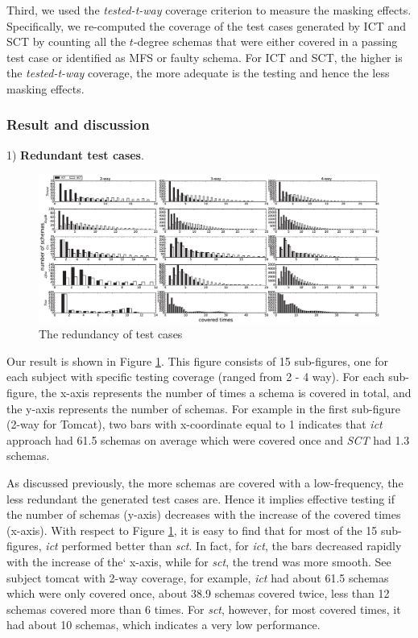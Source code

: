 \documentclass[journal,12pt,onecolumn,draftclsnofoot,]{IEEEtran}
\begin{document}
Third, we used the \emph{tested-t-way} coverage criterion \cite{yilmaz2013reducing} to measure the masking effects. Specifically, we re-computed the coverage of the test cases generated by ICT and SCT by counting all the $t$-degree schemas that were either covered in a passing test case or identified as MFS or faulty schema. For ICT and SCT, the higher is the \emph{tested-t-way} coverage, the more adequate is the testing and hence the less masking effects.


\subsubsection{Result and discussion}

1) \textbf{Redundant test cases}.

\begin{figure}[ht]
 \includegraphics[width=7.0in]{ex1.eps}
\caption{The redundancy of test cases}
\label{ex1_result}
\end{figure}

Our result is shown in Figure \ref{ex1_result}. This figure consists of 15 sub-figures, one for each subject with specific testing coverage (ranged from 2 - 4 way). For each sub-figure, the x-axis represents the number of times a schema is covered in total, and the y-axis represents the number of schemas.  For example in the first sub-figure (2-way for Tomcat), two bars with x-coordinate equal to 1 indicates that \emph{ict} approach had 61.5 schemas {\color{red}on average} which were covered once and \emph{SCT} had 1.3 schemas.


As discussed previously, the more schemas are covered with a low-frequency, the less redundant the generated test cases are. Hence it implies effective testing if the number of schemas (y-axis) decreases with the increase of the covered times (x-axis). With respect to Figure \ref{ex1_result}, it is easy to find that for most of the 15 sub-figures, \emph{ict} performed better than \emph{sct}. In fact, for \emph{ict}, the bars decreased rapidly with the increase of the` x-axis, while for \emph{sct}, the trend was more smooth. See subject tomcat with 2-way coverage, for example, \emph{ict} had about 61.5 schemas which were only covered once,  about 38.9 schemas covered twice, less than 12 schemas covered more than 6 times.  For \emph{sct}, however, for most covered times, it had about 10 schemas, which indicates a very low performance.
\end{document}
